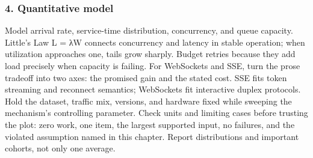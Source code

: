 \subsubsection*{4. Quantitative model}
Model arrival rate, service-time distribution, concurrency, and queue capacity. Little's Law L = λW connects concurrency and latency in stable operation; when utilization approaches one, tails grow sharply. Budget retries because they add load precisely when capacity is failing.
For WebSockets and SSE, turn the prose tradeoff into two axes: the promised gain and the stated cost. SSE fits token streaming and reconnect semantics; WebSockets fit interactive duplex protocols. Hold the dataset, traffic mix, versions, and hardware fixed while sweeping the mechanism's controlling parameter.
Check units and limiting cases before trusting the plot: zero work, one item, the largest supported input, no failures, and the violated assumption named in this chapter. Report distributions and important cohorts, not only one average.
